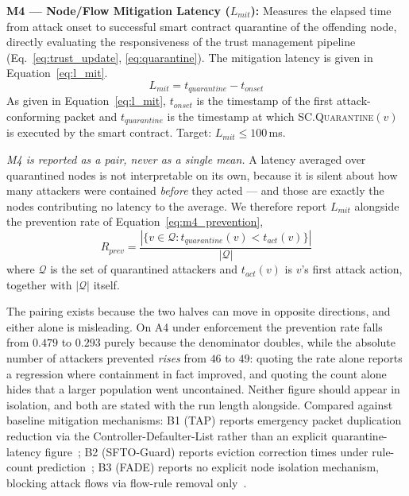 \documentclass[12pt, a4paper]{report}
\begin{document}
{{%

\textbf{M4 — Node/Flow Mitigation Latency
($L_{mit}$):}
Measures the elapsed time from attack onset to
successful smart contract quarantine of the offending
node, directly evaluating the responsiveness of the
trust management pipeline
(Eq.~\ref{eq:trust_update}, \ref{eq:quarantine}).
The mitigation latency is given in
Equation~\eqref{eq:l_mit}.
\begin{equation}
L_{mit} = t_{quarantine} - t_{onset}
\label{eq:l_mit}
\end{equation}
As given in Equation~\eqref{eq:l_mit},
$t_{onset}$ is the timestamp of the first
attack-conforming packet and $t_{quarantine}$ is the
timestamp at which \textsc{SC.Quarantine}$(v)$ is
executed by the smart contract. Target: $L_{mit}
\leq 100$\,ms.

\textit{M4 is reported as a pair, never as a single mean.} A latency averaged
over quarantined nodes is not interpretable on its own, because it is silent
about how many attackers were contained \emph{before} they acted --- and those
are exactly the nodes contributing no latency to the average. We therefore
report $L_{mit}$ alongside the prevention rate of
Equation~\eqref{eq:m4_prevention},
\begin{equation}
R_{prev} = \frac{|\{v \in \mathcal{Q} : t_{quarantine}(v) < t_{act}(v)\}|}
                 {|\mathcal{Q}|}
\label{eq:m4_prevention}
\end{equation}
where $\mathcal{Q}$ is the set of quarantined attackers and $t_{act}(v)$ is
$v$'s first attack action, together with $|\mathcal{Q}|$ itself.

The pairing exists because the two halves can move in opposite directions, and
either alone is misleading. On A4 under enforcement the prevention rate falls
from $0.479$ to $0.293$ purely because the denominator doubles, while the
absolute number of attackers prevented \emph{rises} from $46$ to $49$: quoting
the rate alone reports a regression where containment in fact improved, and
quoting the count alone hides that a larger population went uncontained. Neither
figure should appear in isolation, and both are stated with the run length
alongside. Compared against baseline mitigation mechanisms:
B1 (TAP) reports emergency packet duplication
reduction via the Controller-Defaulter-List rather
than an explicit quarantine-latency
figure~\cite{Arsalan2018}; B2 (SFTO-Guard) reports
eviction correction times under rule-count
prediction~\cite{Tang2023SFTO}; B3 (FADE) reports no
explicit node isolation mechanism, blocking attack
flows via flow-rule removal
only~\cite{Zhang2021FADE}.


}}
\end{document}
